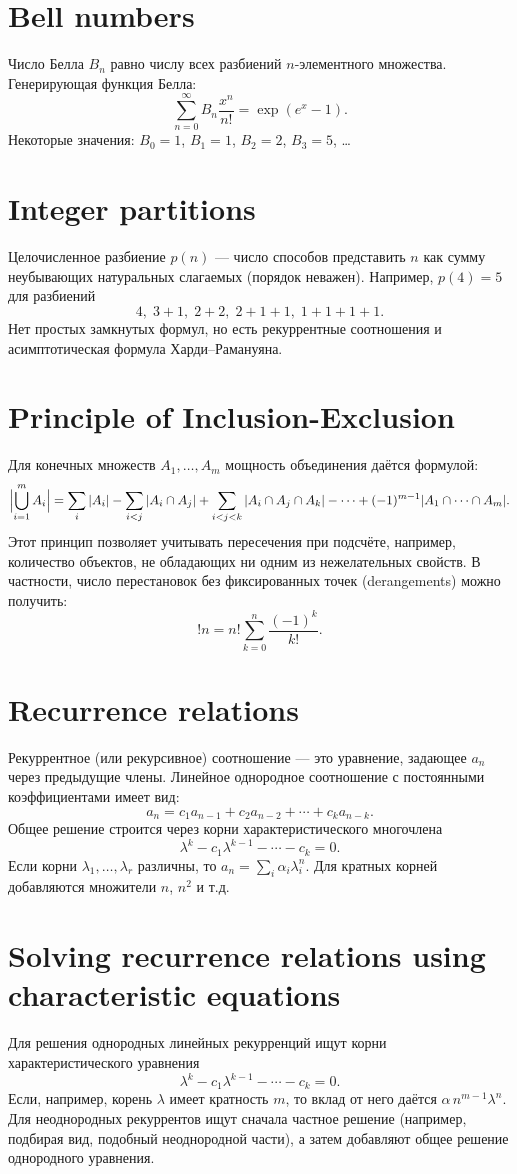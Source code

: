\documentclass{article}
\begin{document}
	\section{Bell numbers}
	Число Белла $B_n$ равно числу всех разбиений $n$-элементного множества. Генерирующая функция Белла:
	\[
	\sum_{n=0}^\infty B_n \frac{x^n}{n!} = \exp(e^x - 1).
	\]
	Некоторые значения: $B_0=1$, $B_1=1$, $B_2=2$, $B_3=5$, \dots
	
	\section{Integer partitions}
	Целочисленное разбиение $p(n)$ --- число способов представить $n$ как сумму неубывающих натуральных слагаемых (порядок неважен). Например, $p(4)=5$ для разбиений 
	\[
	4,\;3+1,\;2+2,\;2+1+1,\;1+1+1+1.
	\]
	Нет простых замкнутых формул, но есть рекуррентные соотношения и асимптотическая формула Харди--Рамануяна.
	
	\section{Principle of Inclusion-Exclusion}
	Для конечных множеств $A_1,\dots,A_m$ мощность объединения даётся формулой:
	\[
	\Bigl|\bigcup_{i=1}^m A_i\Bigr| = \sum_{i}|A_i| - \sum_{i<j}|A_i\cap A_j| + \sum_{i<j<k}|A_i\cap A_j\cap A_k| - \cdots + (-1)^{m-1}|A_1\cap \cdots \cap A_m|.
	\]
	Этот принцип позволяет учитывать пересечения при подсчёте, например, количество объектов, не обладающих ни одним из нежелательных свойств. В частности, число перестановок без фиксированных точек (derangements) можно получить:
	\[
	!n = n!\sum_{k=0}^n \frac{(-1)^k}{k!}.
	\]
	
	\section{Recurrence relations}
	Рекуррентное (или рекурсивное) соотношение --- это уравнение, задающее $a_n$ через предыдущие члены. Линейное однородное соотношение с постоянными коэффициентами имеет вид:
	\[
	a_n = c_1 a_{n-1} + c_2 a_{n-2} + \cdots + c_k a_{n-k}.
	\]
	Общее решение строится через корни характеристического многочлена
	\[
	\lambda^k - c_1 \lambda^{k-1} - \cdots - c_k = 0.
	\]
	Если корни $\lambda_1,\dots,\lambda_r$ различны, то $a_n = \sum_i \alpha_i \lambda_i^n$. Для кратных корней добавляются множители $n$, $n^2$ и т.д.
	
	\section{Solving recurrence relations using characteristic equations}
	Для решения однородных линейных рекурренций ищут корни характеристического уравнения 
	\[
	\lambda^k - c_1 \lambda^{k-1} - \cdots - c_k = 0.
	\]
	Если, например, корень $\lambda$ имеет кратность $m$, то вклад от него даётся $\alpha\,n^{m-1}\lambda^n$. Для неоднородных рекуррентов ищут сначала частное решение (например, подбирая вид, подобный неоднородной части), а затем добавляют общее решение однородного уравнения.
	
\end{document}
